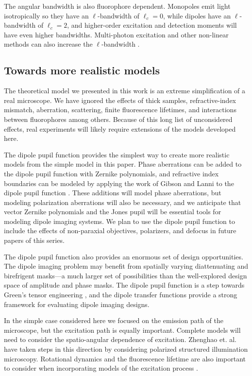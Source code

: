 \documentclass[]{osa-article}
\begin{document}
The angular bandwidth is also fluorophore dependent. Monopoles emit light
isotropically so they have an $\ell$-bandwidth of $\ell_c = 0$, while dipoles
have an $\ell$-bandwidth of $\ell_c = 2$, and higher-order excitation and
detection moments will have even higher bandwidths. Multi-photon excitation and
other non-linear methods can also increase the $\ell$-bandwidth
\cite{brasselet2011}.

\subsection{Towards more realistic models}
The theoretical model we presented in this work is an extreme simplification of
a real microscope. We have ignored the effects of thick samples,
refractive-index mismatch, aberration, scattering, finite fluorescence
lifetimes, and interactions between fluorophores among others. Because of this
long list of unconsidered effects, real experiments will likely require
extensions of the models developed here.

The dipole pupil function provides the simplest way to create more realistic
models from the simple model in this paper. Phase aberrations can be added to
the dipole pupil function with Zernike polynomials, and refractive index
boundaries can be modeled by applying the work of Gibson and Lanni to the dipole
pupil function \cite{gibson89}. These additions will model phase aberrations,
but modeling polarization aberrations will also be necessary, and we anticipate
that vector Zernike polynomials and the Jones pupil \cite{zhao2007, xu2015,
  chipman1989} will be essential tools for modeling dipole imaging systems. We
plan to use the dipole pupil function to include the effects of non-paraxial
objectives, polarizers, and defocus in future papers of this series.

The dipole pupil function also provides an enormous set of design opportunities.
The dipole imaging problem may benefit from spatially varying diattenuating and
birefrigent masks---a much larger set of possibilities than the well-explored
design space of amplitude and phase masks. The dipole pupil function is a step
towards Green's tensor engineering \cite{agrawal2012}, and the dipole transfer
functions provide a strong framework for evaluating dipole imaging designs.

In the simple case considered here we focused on the emission path of the
microscope, but the excitation path is equally important. Complete models will
need to consider the spatio-angular dependence of excitation. Zhenghao et. al.
\cite{zhanghao2017} have taken steps in this direction by considering polarized
structured illumination microscopy. Rotational dynamics and the fluorescence
lifetime are also important to consider when incorporating models of the
excitation process \cite{lew2013, zhang2018, zhang2018-2}.
\end{document}
